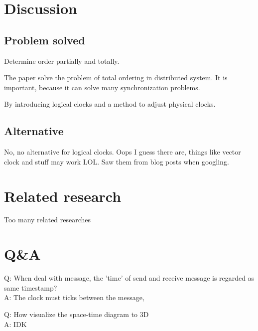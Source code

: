 \documentclass[12pt,a4paper,oneside]{article}
\begin{document}
\section{Discussion}


\subsection{Problem solved}

Determine order partially and totally. %

The paper solve the problem of total ordering in distributed system.
It is important, because it can solve many synchronization problems.

By introducing logical clocks and a method to adjust physical clocks.

\subsection{Alternative}

No, no alternative for logical clocks. Oops I guess there are, things
like vector clock and stuff may work LOL. Saw them from blog posts when googling.

\section{Related research}

Too many related researches

\section{Q\&A}

Q: When deal with message, the 'time' of send and receive message is regarded as same timestamp? \\
A: The clock must ticks between the message,  %

\medskip

Q: How visualize the space-time diagram to 3D \\
A: IDK
\end{document}
